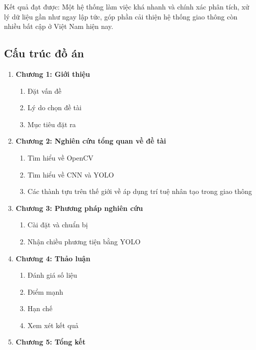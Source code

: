 \documentclass[14pt,oneside,a4paper]{extreport}
\begin{document}
Kết quả đạt được: Một hệ thống làm việc khá nhanh và chính xác phân tích, xử lý dữ liệu gần như ngay lập tức, góp phần cải thiện hệ thống giao thông còn nhiều bất cập ở Việt Nam hiện nay.

\subsection{Cấu trúc đồ án}
\renewcommand{\labelenumi}{}
\renewcommand{\labelenumii}{\arabic{enumi}.\arabic{enumii}.}
\large
\begin{enumerate}
	\item \textbf{Chương 1: Giới thiệu}
	\begin{enumerate}
		\item Đặt vấn đề
		\item Lý do chọn đề tài 
		\item Mục tiêu đặt ra
	\end{enumerate}
	\item \textbf{Chương 2: Nghiên cứu tổng quan về đề tài}
	\begin{enumerate}
		\item Tìm hiểu về OpenCV
		\item Tìm hiểu về CNN và YOLO
		\item Các thành tựu trên thế giới về áp dụng trí tuệ nhân tạo trong giao thông
	\end{enumerate}
	\item \textbf{Chương 3: Phương pháp nghiên cứu}
	\begin{enumerate}
		\item Cài đặt và chuẩn bị
		\item Nhận chiều phương tiện bằng YOLO
	\end{enumerate}
	\item \textbf{Chương 4: Thảo luận}
	\begin{enumerate}
		\item Đánh giá số liệu
		\item Điểm mạnh
		\item Hạn chế
		\item Xem xét kết quả
	\end{enumerate}
	\item \textbf{Chương 5: Tổng kết}
\end{enumerate}
\end{document}
